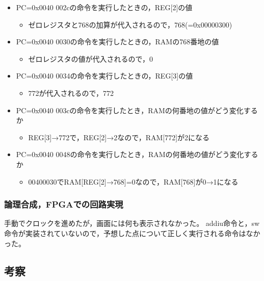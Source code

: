 \begin{itemize}
  \item PC=0x0040 002cの命令を実行したときの，REG[2]の値
  \begin{itemize}
    \item ゼロレジスタと768の加算が代入されるので，768(=0x00000300)
  \end{itemize}
  \item PC=0x0040 0030の命令を実行したときの，RAMの768番地の値
  \begin{itemize}
    \item ゼロレジスタの値が代入されるので，0
  \end{itemize}
  \item PC=0x0040 0034の命令を実行したときの，REG[3]の値
  \begin{itemize}
    \item 772が代入されるので，772
  \end{itemize}
  \item PC=0x0040 003cの命令を実行したとき，RAMの何番地の値がどう変化するか
  \begin{itemize}
    \item REG[3]→772で，REG[2]→2なので，RAM[772]が2になる
  \end{itemize}
  \item PC=0x0040 0048の命令を実行したとき，RAMの何番地の値がどう変化するか
  \begin{itemize}
    \item 00400030でRAM[REG[2]→768]=0なので，RAM[768]が0→1になる
  \end{itemize}
\end{itemize}

\subsubsection{論理合成，FPGAでの回路実現}
手動でクロックを進めたが，画面には何も表示されなかった。
addiu命令と，sw命令が実装されていないので，予想した点について正しく実行される命令はなかった。

\subsection{考察}
